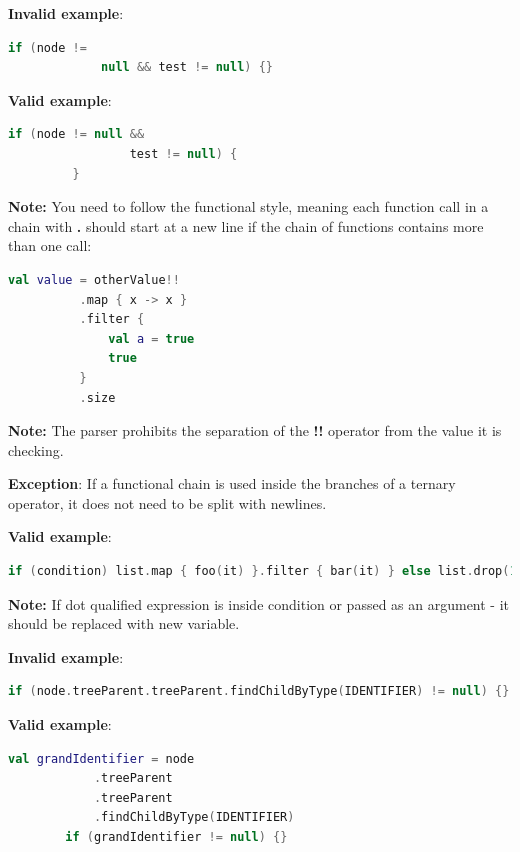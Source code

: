 \textbf{Invalid example}: 

\begin{lstlisting}[language=Kotlin]
     if (node !=
             null && test != null) {}
\end{lstlisting}
 

\textbf{Valid example}: 

\begin{lstlisting}[language=Kotlin]
         if (node != null && 
                 test != null) {
         }
\end{lstlisting}
  

\textbf{Note:} You need to follow the functional style, meaning each function call in a chain with \textbf{.} should start at a new line if the chain of functions contains more than one call:

\begin{lstlisting}[language=Kotlin]
  val value = otherValue!!
          .map { x -> x }
          .filter {
              val a = true
              true
          }
          .size    
\end{lstlisting}
\textbf{Note:} The parser prohibits the separation of the \textbf{!!} operator from the value it is checking.



\textbf{Exception}: If a functional chain is used inside the branches of a ternary operator, it does not need to be split with newlines.



\textbf{Valid example}:  

\begin{lstlisting}[language=Kotlin]
if (condition) list.map { foo(it) }.filter { bar(it) } else list.drop(1)
\end{lstlisting}


\textbf{Note:} If dot qualified expression is inside condition or passed as an argument - it should be replaced with new variable.



\textbf{Invalid example}: 

\begin{lstlisting}[language=Kotlin]
 if (node.treeParent.treeParent.findChildByType(IDENTIFIER) != null) {}
\end{lstlisting}
 

\textbf{Valid example}: 

\begin{lstlisting}[language=Kotlin]
        val grandIdentifier = node
            .treeParent
            .treeParent
            .findChildByType(IDENTIFIER)
        if (grandIdentifier != null) {}
\end{lstlisting}
  

